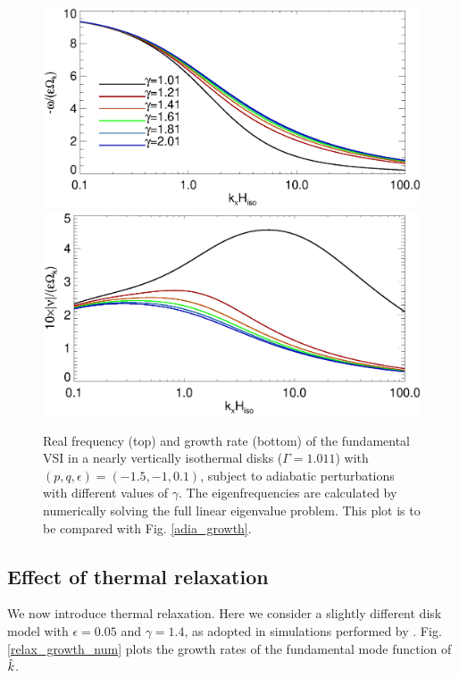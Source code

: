 \begin{figure}
  \includegraphics[width=\linewidth,clip=true,trim=0cm 1.75cm 0cm 0cm]{figures/compare_eigen_real1}
  \includegraphics[width=\linewidth,clip=true,trim=0cm 0cm 0cm 1cm]{figures/compare_eigen_imag1}
  \caption{Real frequency (top) and growth rate 
    (bottom) of the fundamental VSI in a nearly vertically   
    isothermal disks ($\Gamma=1.011$) with $(p,q,\epsilon)=(-1.5,-1,0.1)$, 
    subject to adiabatic perturbations with different values of $\gamma$. 
    The eigenfrequencies are calculated by numerically
    solving the full linear eigenvalue problem. This plot is to
    be compared with Fig. \ref{adia_growth}. \label{adia_growth_num}}   
\end{figure}   

\subsection{Effect of thermal relaxation}
We now introduce thermal relaxation. Here we consider a slightly
different disk model with $\epsilon=0.05$ and $\gamma=1.4$, as
adopted in simulations performed by \cite{nelson13}. 
Fig. \ref{relax_growth_num} plots the
growth rates of the fundamental mode function of $\hat{k}$.  

